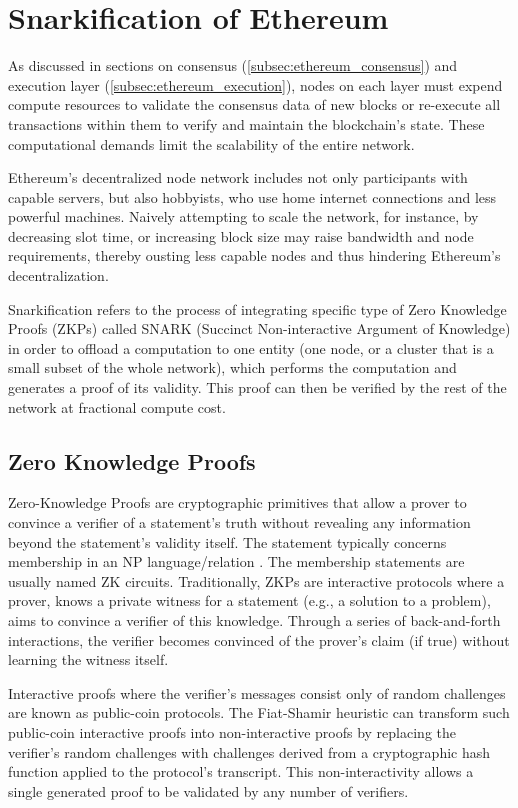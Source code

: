 \section{Snarkification of Ethereum}\label{sec:snarkification}

As discussed in sections on consensus (\ref{subsec:ethereum_consensus}) and
execution layer (\ref{subsec:ethereum_execution}), nodes on each layer must expend
compute resources to validate the consensus data of new blocks or re-execute all
transactions within them to verify and maintain the blockchain's state.
These computational demands limit the scalability of the entire network.

Ethereum's decentralized node network includes not only participants with
capable servers, but also hobbyists, who use home internet connections and
less powerful machines. Naively attempting to scale the network, for instance,
by decreasing slot time, or increasing block size may raise bandwidth and node
requirements, thereby ousting less capable nodes and thus hindering Ethereum's
decentralization.

Snarkification refers to the process of integrating specific type of Zero
Knowledge Proofs (ZKPs) called SNARK (Succinct Non-interactive Argument of
Knowledge) in order to offload a computation to one entity (one node, or a
cluster that is a small subset of the whole network), which performs the
computation and generates a proof of its validity. This proof can then be
verified by the rest of the network at fractional compute cost.

\subsection{Zero Knowledge Proofs}

Zero-Knowledge Proofs are cryptographic primitives that allow a prover
to convince a verifier of a statement's truth without revealing any
information beyond the statement's validity itself. The statement typically
concerns membership in an NP language/relation \cite{GoldreichNPProofs}.
The membership statements are usually named ZK circuits.
Traditionally, ZKPs are interactive protocols where a prover, knows a
private witness for a statement (e.g., a solution to a problem), aims to
convince a verifier of this knowledge. Through a series of back-and-forth
interactions, the verifier becomes convinced of the prover's claim (if true)
without learning the witness itself.

Interactive proofs where the verifier's messages consist only of random
challenges are known as public-coin protocols. The Fiat-Shamir heuristic \cite{FiatShamir}
can transform such public-coin interactive proofs into non-interactive
proofs by replacing the verifier's random challenges with challenges derived
from a cryptographic hash function applied to the protocol's transcript. This
non-interactivity allows a single generated proof to be validated by any
number of verifiers.

